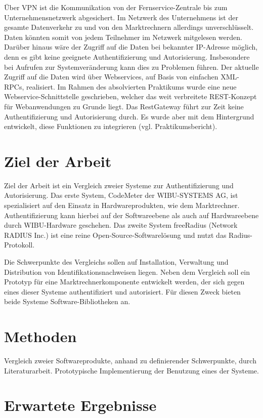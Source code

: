 \documentclass{article}
\begin{document}
Über VPN ist die Kommunikation von der Fernservice-Zentrale bis zum Unternehmensnetzwerk abgesichert. Im Netzwerk des Unternehmens ist der gesamte Datenverkehr zu und von den Marktrechnern allerdings unverschlüsselt. Daten könnten somit von jedem Teilnehmer im Netzwerk mitgelesen werden. Darüber hinaus wäre der Zugriff auf die Daten bei bekannter IP-Adresse möglich, denn es gibt keine geeignete Authentifizierung und Autorisierung. Insbesondere bei Aufrufen zur Systemveränderung kann dies zu Problemen führen. Der aktuelle Zugriff auf die Daten wird über Webservices, auf Basis von einfachen XML-RPCs, realisiert. Im Rahmen des absolvierten Praktikums wurde eine neue Webservice-Schnittstelle geschrieben, welcher das weit verbreitete REST-Konzept für Webanwendungen zu Grunde liegt. Das RestGateway führt zur Zeit keine Authentifizierung und Autorisierung durch. Es wurde aber mit dem Hintergrund entwickelt, diese Funktionen zu integrieren (vgl. Praktikumsbericht).

\section{Ziel der Arbeit}

Ziel der Arbeit ist ein Vergleich zweier Systeme zur Authentifizierung und Autorisierung. Das erste System, CodeMeter der WIBU-SYSTEMS AG, ist spezialisiert auf den Einsatz in Hardwareprodukten, wie dem Marktrechner. Authentifizierung kann hierbei auf der Softwareebene als auch auf Hardwareebene durch WIBU-Hardware geschehen. Das zweite System freeRadius (Network RADIUS Inc.) ist eine reine Open-Source-Softwarelösung und nutzt das Radius-Protokoll.

Die Schwerpunkte des Vergleichs sollen auf Installation, Verwaltung und Distribution von Identifikationsnachweisen liegen. Neben dem Vergleich soll ein Prototyp für eine Marktrechnerkomponente entwickelt werden, der sich gegen eines dieser Systeme authentifiziert und autorisiert. Für diesen Zweck bieten beide Systeme Software-Bibliotheken an.

\section{Methoden}

Vergleich zweier Softwareprodukte, anhand zu definierender Schwerpunkte, durch Literaturarbeit. Prototypische Implementierung der Benutzung eines der Systeme.

\section{Erwartete Ergebnisse}
\end{document}

